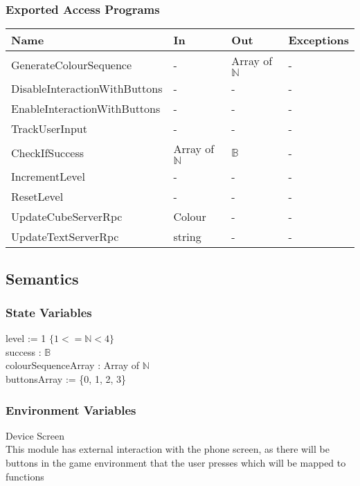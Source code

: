 \documentclass[12pt, titlepage]{article}
\begin{document}
\subsubsection{Exported Access Programs}

\begin{center}
\begin{tabular}{p{5cm} p{4cm} p{4cm} p{2cm}}
\hline
\textbf{Name} & \textbf{In} & \textbf{Out} & \textbf{Exceptions} \\
\hline
GenerateColourSequence & - & Array of $\mathds{N}$ & - \\
DisableInteractionWithButtons & - & - & - \\
EnableInteractionWithButtons & - & - & - \\
TrackUserInput & - & - & - \\
CheckIfSuccess & Array of $\mathds{N}$ & $\mathds{B}$ & - \\
IncrementLevel & - & - & - \\
ResetLevel & - & - & - \\
UpdateCubeServerRpc & Colour & - & - \\
UpdateTextServerRpc & string & - & - \\
\hline
\end{tabular}
\end{center}

\subsection{Semantics}

\subsubsection{State Variables}
level := 1 $\{1<=\mathbb{N}<4\}$\\
success : $\mathds{B}$\\
colourSequenceArray : Array of $\mathds{N}$\\
buttonsArray := \{0, 1, 2, 3\}\\

\subsubsection{Environment Variables}

Device Screen\\
This module has external interaction with the phone screen, as there will be buttons in the game environment that the user presses which will be mapped to functions
\end{document}
